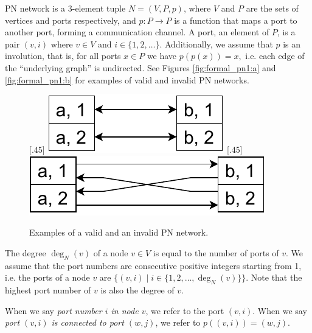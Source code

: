 PN network is a 3-element tuple $N = (V, P, p)$, where $V$ and $P$ are the sets of vertices and ports respectively, and $p\colon P \rightarrow P$ is a function that maps a port to another port, forming a communication channel.
A port, an element of $P$, is a pair $(v, i)$ where $v \in V$ and $i \in \{1, 2, \dotsc\}$.
Additionally, we assume that $p$ is an involution, that is, for all ports $x \in P$ we have $p(p(x)) = x, $ i.e. each edge of the ``underlying graph'' is undirected.
See Figures \ref{fig:formal_pn1:a} and \ref{fig:formal_pn1:b} for examples of valid and invalid PN networks.

\begin{figure}[H]
    [.45\linewidth] {
    \centering
    \includegraphics[scale=0.6]{diagrams/formalizing_pn_network_diagram1.pdf}
  }
  \hfill
    [.45\linewidth] {
    \centering
    \includegraphics[scale=0.6]{diagrams/formalizing_pn_network_diagram2.pdf}
  }
  \caption{Examples of a valid and an invalid PN network.}
  \label{fig:formal_pn1}
\end{figure}


The degree $\deg_N(v)$ of a node $v \in V$ is equal to the number of ports of $v$.
We assume that the port numbers are consecutive positive integers starting from 1, i.e. the ports of a node $v$ are $\{(v, i) \mid i \in \{1, 2, \dotsc, \deg_N(v)\}\}$.
Note that the highest port number of $v$ is also the degree of $v$.

When we say \emph{port number $i$ in node $v$}, we refer to the port $(v, i)$.
When we say \emph{port $(v, i)$ is connected to port $(w, j)$}, we refer to $p((v, i)) = (w, j)$.

